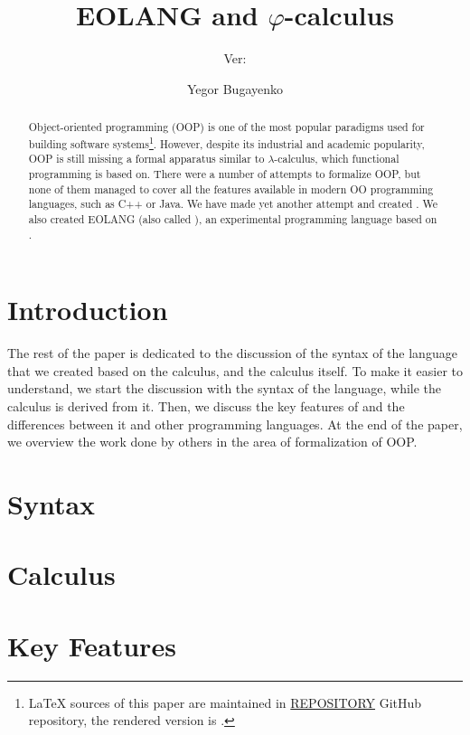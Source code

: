 \documentclass[acmsmall,nonacm,11pt]{acmart}
\title{EOLANG and \texorpdfstring{\(\varphi\)}{phi}-calculus}
\subtitle{%
  Ver:
  \texorpdfstring{
    \href{https://github.com/REPOSITORY/releases/tag/0.0.0}
      {\ff{0.0.0}}
  }{0.0.0}
}
\author{Yegor Bugayenko}
\affiliation{
  \institution{Huawei}
  \city{Moscow}
  \country{Russia}
}
\begin{document}
\begin{abstract}
Object-oriented programming (OOP) is one of the most popular
paradigms used for building software systems\footnote{%
  \LaTeX{} sources of this paper are maintained in
  \href{https://github.com/REPOSITORY}{REPOSITORY} GitHub repository,
  the rendered version is \href{https://github.com/REPOSITORY/releases/tag/0.0.0}{}.}.
However, despite
its industrial and academic popularity, OOP is still missing
a formal apparatus similar to \(\lambda\)-calculus, which functional
programming is based on. There were a number of attempts to formalize
OOP, but none of them managed to cover all the features available in
modern OO programming languages, such as C++ or Java.
We have made yet another attempt and created \phic{}. We also
created EOLANG (also called \eolang{}), an experimental
programming language based on \phic{}.
\end{abstract}

\maketitle

\section{Introduction}
\label{sec:intro}


The rest of the paper is dedicated to the discussion of the syntax of the language that we created based on the calculus, and the calculus itself.
To make it easier to understand, we start the discussion with the syntax of the language, while the calculus is derived from it.
Then, we discuss the key features of \eolang{} and the differences between it and other programming languages.
At the end of the paper, we overview the work done by others in the area of formalization of OOP.

\section{Syntax}
\label{sec:syntax}


\section{Calculus}
\label{sec:calculus}


\section{Key Features}
\label{sec:features}

\end{document}
